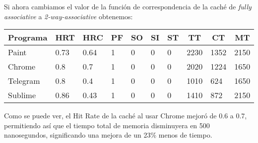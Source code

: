 \documentclass{article}
\begin{document}
Si ahora cambiamos el valor de la función de correspondencia de la caché de \textit{fully associative} a \textit{2-way-associative} obtenemos:

\begin{table}[H]
\begin{tabular}{|l|l|l|l|l|l|l|l|l|l|}
\hline
\multicolumn{1}{|c|}{\textbf{Programa}} & \multicolumn{1}{c|}{\textbf{HRT}} & \multicolumn{1}{c|}{\textbf{HRC}} & \multicolumn{1}{c|}{\textbf{PF}} & \multicolumn{1}{c|}{\textbf{SO}} & \multicolumn{1}{c|}{\textbf{SI}} & \multicolumn{1}{c|}{\textbf{ST}} & \multicolumn{1}{c|}{\textbf{TT}} & \multicolumn{1}{c|}{\textbf{CT}} & \multicolumn{1}{c|}{\textbf{MT}} \\ \hline
Paint                                   & 0.73                              & 0.64                              & 1                                & 0                                & 0                                & 0                                & 2230                             & 1352                             & 2150                             \\ \hline
Chrome                                  & 0.8                               & 0.7                               & 1                                & 0                                & 0                                & 0                                & 2020                             & 1224                             & 1650                             \\ \hline
Telegram                                & 0.8                               & 0.4                               & 1                                & 0                                & 0                                & 0                                & 1010                             & 624                              & 1650                             \\ \hline
Sublime                                 & 0.86                              & 0.43                              & 1                                & 0                                & 0                                & 0                                & 1410                             & 872                              & 2150                             \\ \hline
\end{tabular}
\end{table}

Como se puede ver, el Hit Rate de la caché al usar Chrome mejoró de 0.6 a 0.7, permitiendo así que el tiempo total de memoria disminuyera en 500 nanosegundos, significando una mejora de un 23\% menos de tiempo.\\
\end{document}
